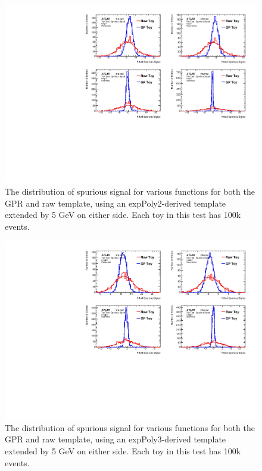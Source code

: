 \begin{figure} 
\begin{center}
  \includegraphics[width=\textwidth]{figures/background/gpr/validation/padded/ToyTest_FitSigVals_lowpT_100k_noSig}   
\caption{The distribution of spurious signal for various functions for both the GPR and raw template, using an expPoly2-derived template extended by 5 GeV on either side. Each toy in this test has 100k events.}
\label{fig:padded_lowpt_100k_noSig}
\end{center}
\end{figure}

\begin{figure} 
\begin{center}
  \includegraphics[width=\textwidth]{figures/background/gpr/validation/padded/ToyTest_FitSigVals_medpT_100k_noSig}   
\caption{The distribution of spurious signal for various functions for both the GPR and raw template, using an expPoly3-derived template extended by 5 GeV on either side. Each toy in this test has 100k events.}
\label{fig:padded_medpt_100k_noSig}
\end{center}
\end{figure}

